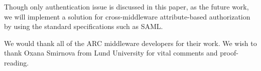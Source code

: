 \documentclass[twocolumn]{svjour3}         %
\begin{document}
Though only authentication issue is discussed in this paper, as the future work, we will implement a solution for cross-middleware attribute-based authorization by using the standard specifications such as SAML.




%


\begin{acknowledgements}
We would thank all of the ARC middleware developers for their work. We wish to thank Oxana Smirnova from Lund University for vital comments and proof-reading.
\end{acknowledgements}
\end{document}
